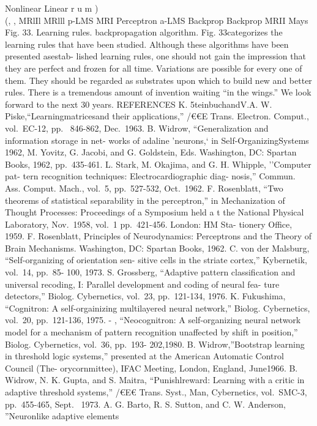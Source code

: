 Nonlinear Linear r u m )\\
(, , MRlIl MRlll p-LMS MRI Perceptron a-LMS Backprop Backprop MRII Mays
Fig. 33. Learning rules. backpropagation algorithm. Fig. 33categorizes
the learning rules that have been studied. Although these algorithms
have been presented asestab- lished learning rules, one should not gain
the impression that they are perfect and frozen for all time. Variations
are possible for every one of them. They should be regarded as
substrates upon which to build new and better rules. There is a
tremendous amount of invention waiting ``in the wings.'' We look forward
to the next 30 years. REFERENCES K. 5teinbuchandV.A. W.
Piske,``Learningmatricesand their applications,'' /€€E Trans. Electron.
Comput., vol.~EC-12, pp.~ 846-862, Dec.~1963. B. Widrow,
``Generalization and information storage in net- works of adaline
'neurons,` in Self-OrganizingSystems 1962, M. Yovitz, G. Jacobi, and G.
Goldstein, Eds. Washington, DC: Spartan Books, 1962, pp.~435-461. L.
Stark, M. Okajima, and G. H. Whipple, ''Computer pat- tern recognition
techniques: Electrocardiographic diag- nosis,'' Commun. Ass. Comput.
Mach., vol.~5, pp.~527-532, Oct.~1962. F. Rosenblatt, ``Two theorems of
statistical separability in the perceptron,'' in Mechanization of
Thought Processes: Proceedings of a Symposium held a t the National
Physical Laboratory, Nov.~1958, vol.~1 pp.~421-456. London: HM Sta-
tionery Office, 1959. F. Rosenblatt, Principles of Neurodynamics:
Perceptrons and the Theory of Brain Mechanisms. Washington, DC: Spartan
Books, 1962. C. von der Malsburg, ``Self-organizing of orientation sen-
sitive cells in the striate cortex,'' Kybernetik, vol.~14, pp.~85- 100,
1973. S. Grossberg, ``Adaptive pattern classification and universal
recoding, I: Parallel development and coding of neural fea- ture
detectors,'' Biolog. Cybernetics, vol.~23, pp.~121-134, 1976. K.
Fukushima, ``Cognitron: A self-orgainizing multilayered neural
network,'' Biolog. Cybernetics, vol.~20, pp.~121-136, 1975. - ,
``Neocognitron: A self-organizing neural network model for a mechanism
of pattern recognition unaffected by shift in position,'' Biolog.
Cybernetics, vol.~36, pp.~193- 202,1980. B. Widrow,''Bootstrap learning
in threshold logic systems,'' presented at the American Automatic
Control Council (The- orycornmittee), IFAC Meeting, London, England,
June1966. B. Widrow, N. K. Gupta, and S. Maitra, ``Punishlreward:
Learning with a critic in adaptive threshold systems,'' /€E€ Trans.
Syst., Man, Cybernetics, vol.~SMC-3, pp.~455-465, Sept.~ 1973. A. G.
Barto, R. S. Sutton, and C. W. Anderson, ''Neuronlike adaptive elements

